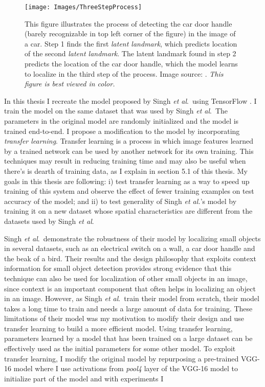 \documentclass [11pt,letterpaper ,openany ]{report}
\begin{document}
    \begin{wrapfigure}{l}[0mm]{0.6\textwidth}
        \begin{center}
            \texttt{[image: Images/ThreeStepProcess]}
        \end{center}
        \caption{This figure illustrates the process of detecting the car door handle (barely recognizable in top left corner of the figure) in the image of a car. Step 1 finds the first \textit{latent landmark}, which predicts location of the second \textit{latent landmark}. The latent landmark found in step 2 predicts the location of the car door handle, which the model learns to localize in the third step of the process. Image source: \cite{Singh_2016_CVPR}. \textit{This figure is best viewed in color.}}
    \end{wrapfigure}            

    In this thesis I recreate the model proposed by Singh \textit{et al}.\ using TensorFlow \cite{girija2016tensorflow}. I train the model on the same dataset that was used by Singh \textit{et al}.\ The parameters in the original model are randomly initialized and the model is trained end-to-end. I propose a modification to the model by incorporating \textit {transfer learning}. Transfer learning is a process in which image features learned by a trained network can be used by another network for its own training. This techniques may result in reducing training time and may also be useful when there's is dearth of training data, as I explain in section 5.1 of this thesis. My goals in this thesis are following: i) test transfer learning as a way to speed up training of this system and observe the effect of fewer training examples on test accuracy of the model; and ii) to test generality of Singh \textit{et al.}'s model by training it on a new dataset whose spatial characteristics are different from the datasets used by Singh \textit{et al}.\

    Singh \textit {et al}.\ demonstrate the robustness of their model by localizing small objects in several datasets, such as an electrical switch on a wall, a car door handle and the beak of a bird. Their results and the design philosophy that exploits context information for small object detection provides strong evidence that this technique can also be used for localization of other small objects in an image, since context is an important component that often helps in localizing an object in an image. However, as Singh \textit{et al}.\ train their model from scratch, their model takes a long time to train and needs a large amount of data for training. These limitations of their model was my motivation to modify their design and use transfer learning to build a more efficient model. Using transfer learning, parameters learned by a model that has been trained on a large dataset can be effectively used as the initial parameters for some other model. To exploit transfer learning, I modify the original model by repurposing a pre-trained VGG-16 \cite{simonyan2014very} model where I use activations from \textit{pool4} layer of the VGG-16 model to initialize part of the model and with experiments I 
\end{document}
